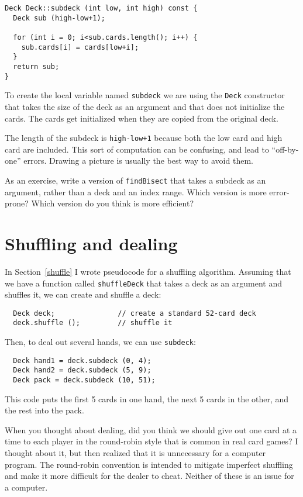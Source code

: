 \begin{lstlisting}
Deck Deck::subdeck (int low, int high) const {
  Deck sub (high-low+1);
	
  for (int i = 0; i<sub.cards.length(); i++) {
    sub.cards[i] = cards[low+i];
  }
  return sub;
}
\end{lstlisting}
%
To create the local variable named {\tt subdeck} we are using
the {\tt Deck} constructor that takes the size of the deck
as an argument and that does not initialize the cards.  The
cards get initialized when they are copied from the original
deck.

The length of the subdeck is {\tt high-low+1} because both the low
card and high card are included.  This sort of computation can be
confusing, and lead to ``off-by-one'' errors.  Drawing a picture is
usually the best way to avoid them.


As an exercise, write a version of {\tt findBisect} that takes a
subdeck as an argument, rather than a deck and an index range.  Which
version is more error-prone?  Which version do you think is more
efficient?

\section{Shuffling and dealing}

In Section~\ref{shuffle} I wrote pseudocode for a shuffling algorithm.
Assuming that we have a function called {\tt shuffleDeck} that takes
a deck as an argument and shuffles it, we can create and shuffle
a deck:

\begin{lstlisting}
  Deck deck;               // create a standard 52-card deck
  deck.shuffle ();         // shuffle it
\end{lstlisting}
%
Then, to deal out several hands, we can use {\tt subdeck}:

\begin{lstlisting}
  Deck hand1 = deck.subdeck (0, 4);
  Deck hand2 = deck.subdeck (5, 9);
  Deck pack = deck.subdeck (10, 51);
\end{lstlisting}
%
This code puts the first 5 cards in one hand, the next 5 cards
in the other, and the rest into the pack.

When you thought about dealing, did you think we should give out one
card at a time to each player in the round-robin style that is common
in real card games?  I thought about it, but then realized that it is
unnecessary for a computer program.  The round-robin convention is
intended to mitigate imperfect shuffling and make it more difficult
for the dealer to cheat.  Neither of these is an issue for a computer.

